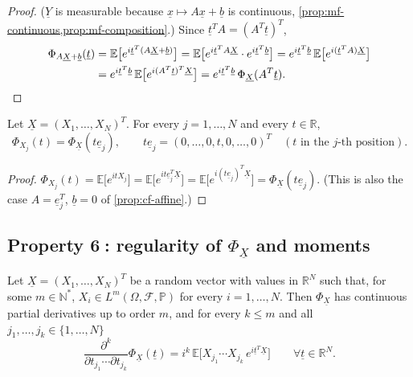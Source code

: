 \begin{proof}
($\underline Y$ is measurable because $\underline x\mapsto A\underline x+\underline b$ is
continuous, \cref{prop:mf-continuous,prop:mf-composition}.) Since
$\underline t^TA=(A^T\underline t)^T$,
\[
\begin{aligned}
  \Phi_{A\underline X+\underline b}(\underline t)
  &=\mathbb E\big[e^{i\underline t^T(A\underline X+\underline b)}\big]
  =\mathbb E\big[e^{i\underline t^TA\underline X}\cdot e^{i\underline t^T\underline b}\big]
  =e^{i\underline t^T\underline b}\,\mathbb E\big[e^{i(\underline t^TA)\underline X}\big]\\
  &=e^{i\underline t^T\underline b}\,\mathbb E\big[e^{i(A^T\underline t)^T\underline X}\big]
  =e^{i\underline t^T\underline b}\,\Phi_{\underline X}(A^T\underline t).\qedhere
\end{aligned}
\]
\end{proof}

\begin{proposition}\label{prop:cf-marginals}
Let $\underline X=(X_1,\dots,X_N)^T$. For every $j=1,\dots,N$ and every $t\in\mathbb R$,
\[
  \Phi_{X_j}(t)=\Phi_{\underline X}(t\underline e_j),\qquad
  t\underline e_j=(0,\dots,0,t,0,\dots,0)^T\quad(t\text{ in the $j$-th position}).
\]
\end{proposition}

\begin{proof}
$\Phi_{X_j}(t)=\mathbb E\big[e^{itX_j}\big]=\mathbb E\big[e^{it\underline e_j^T\underline X}\big]
=\mathbb E\big[e^{i(t\underline e_j)^T\underline X}\big]=\Phi_{\underline X}(t\underline e_j)$.
(This is also the case $A=\underline e_j^T$, $\underline b=0$ of \cref{prop:cf-affine}.)
\end{proof}

\subsection{Property \textcircled{\scriptsize 6}: regularity of \texorpdfstring{$\Phi_{\underline X}$}{the characteristic function} and moments}\label{sec:cf-moments}

\begin{theorem}\label{thm:cf-moments}
Let $\underline X=(X_1,\dots,X_N)^T$ be a random vector with values in $\mathbb R^N$ such that,
for some $m\in\mathbb N^*$, $X_i\in L^m(\Omega,\mathcal F,\mathbb P)$ for every $i=1,\dots,N$.
Then $\Phi_{\underline X}$ has continuous partial derivatives up to order $m$, and for every
$k\le m$ and all $j_1,\dots,j_k\in\{1,\dots,N\}$
\[
  \frac{\partial^k}{\partial t_{j_1}\cdots\partial t_{j_k}}\Phi_{\underline X}(\underline t)
  =i^k\,\mathbb E\big[X_{j_1}\cdots X_{j_k}\,e^{i\underline t^T\underline X}\big]
  \qquad\forall\underline t\in\mathbb R^N .
\]
\end{theorem}

